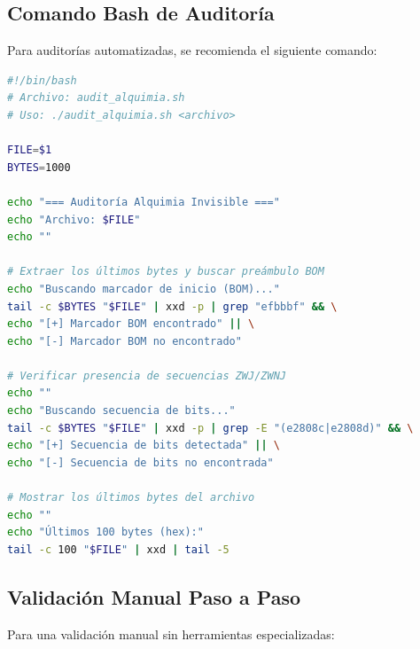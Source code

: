 
\subsection{Comando Bash de Auditoría}

Para auditorías automatizadas, se recomienda el siguiente comando:

\begin{lstlisting}[language=bash, caption={Comando de Auditoría}]
#!/bin/bash
# Archivo: audit_alquimia.sh
# Uso: ./audit_alquimia.sh <archivo>

FILE=$1
BYTES=1000

echo "=== Auditoría Alquimia Invisible ==="
echo "Archivo: $FILE"
echo ""

# Extraer los últimos bytes y buscar preámbulo BOM
echo "Buscando marcador de inicio (BOM)..."
tail -c $BYTES "$FILE" | xxd -p | grep "efbbbf" && \
echo "[+] Marcador BOM encontrado" || \
echo "[-] Marcador BOM no encontrado"

# Verificar presencia de secuencias ZWJ/ZWNJ
echo ""
echo "Buscando secuencia de bits..."
tail -c $BYTES "$FILE" | xxd -p | grep -E "(e2808c|e2808d)" && \
echo "[+] Secuencia de bits detectada" || \
echo "[-] Secuencia de bits no encontrada"

# Mostrar los últimos bytes del archivo
echo ""
echo "Últimos 100 bytes (hex):"
tail -c 100 "$FILE" | xxd | tail -5
\end{lstlisting}


\subsection{Validación Manual Paso a Paso}

Para una validación manual sin herramientas especializadas:

